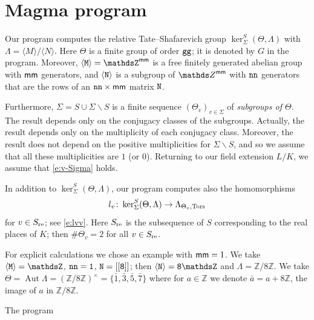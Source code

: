\documentclass[11pt]{amsart}
\renewcommand{\mathbb}{\mathds}
\theoremstyle{plain}
\theoremstyle{definition}
\newcommand{\Z}{{\mathbb Z}}
\DeclareMathOperator{\Aut}{Aut}
\newcommand{\Tors}{{\rm Tors}}
\newcommand{\Thv}{{\Theta_v}}
\newcommand{\la}{\langle}
\newcommand{\ra}{\rangle}
\newcommand{\smm}{{\sf mm}}
\newcommand{\re}{{\rm re}}
\begin{document}
\appendix

\section{Magma program}
\label{app:Magma}



Our program computes the relative Tate--Shafarevich group
$\ker_{\Sigma}^S(\Theta, \Lambda)$ with $\Lambda=\la M\ra/\la N\ra $.
Here $\Theta$ is a finite group of order $\tt gg$;
it is denoted by $G$ in the program.
Moreover, $\tt\la M\ra= \Z^\smm$ is a free
finitely generated abelian group with $\smm$ generators,
and $\tt\la N\ra$ is a subgroup of $\Z^\smm$ with $\tt nn$ generators
that are the rows of an $\tt nn\times \smm$ matrix $\tt N$.

Furthermore, $\Sigma= S\cup \Sigma\smallsetminus S$
is a  finite sequence $(\Thv)_{v\in\Sigma}$ of {\em  subgroups of $\Theta$}.
The result depends only on the conjugacy classes of the subgroups.
Actually, the result depends only on the multiplicity of each conjugacy class.
Moreover, the result does not depend
on the positive multiplicities for $\Sigma\smallsetminus S$,
and so we assume that all these multiplicities are $1$ (or $0$).
Returning to our field extension $L/K$,
we assume that \eqref{e:v-Sigma} holds.


In addition to $\ker_{\Sigma}^S(\Theta, \Lambda)$, our program computes also
the homomorphisms
\[l_v\colon \ker_{\Sigma}^S(\Theta, \Lambda) \to \Lambda_{\Theta_v,\Tors}\]
for $v\in S_\re$; see \eqref{e:lvv}.
Here $S_\re$ is the subsequence of $S$ corresponding to the real places of $K$;
then $\#\Theta_v=2$ for all $v\in S_\re$.


For explicit calculations we chose an example with $\smm=1$.
We take $\tt \la M\ra=\Z$, $\tt nn=1$, $\tt N=[[8]]$;
then $\tt\la N\ra= 8\Z$ and  $\Lambda=\Z/8\Z$.
We take $\Theta=\Aut \Lambda=(\Z/8\Z)^\times=\{\bar 1,\bar3,\bar5,\bar 7\}$
where for $a\in\Z$ we denote  $\bar a=a+8\Z$, the image of $a$ in $\Z/8\Z$.





\bigskip

\centerline{\sc The program}
\medskip
\end{document}
